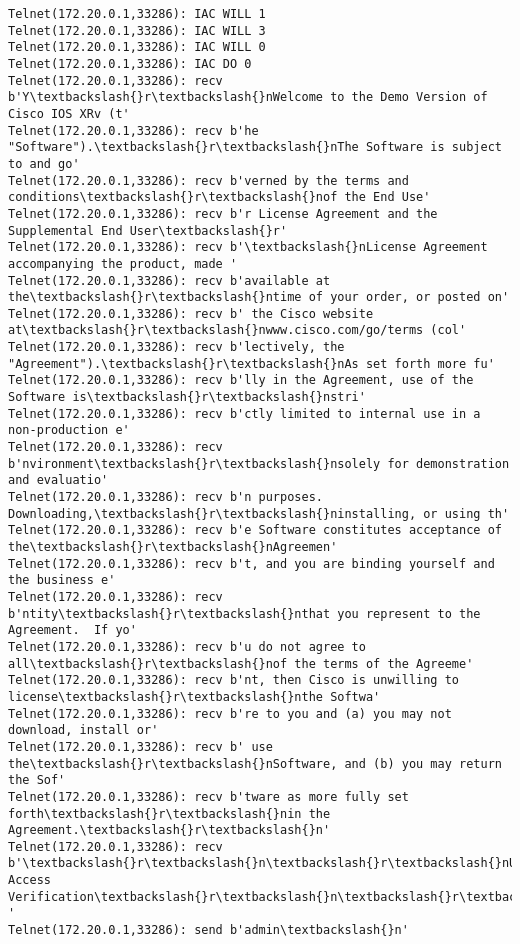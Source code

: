 \documentclass[11pt]{article}
\begin{document}
\begin{Verbatim}[commandchars=\\\{\}]
Telnet(172.20.0.1,33286): IAC WILL 1
Telnet(172.20.0.1,33286): IAC WILL 3
Telnet(172.20.0.1,33286): IAC WILL 0
Telnet(172.20.0.1,33286): IAC DO 0
Telnet(172.20.0.1,33286): recv b'Y\textbackslash{}r\textbackslash{}nWelcome to the Demo Version of Cisco IOS XRv (t'
Telnet(172.20.0.1,33286): recv b'he "Software").\textbackslash{}r\textbackslash{}nThe Software is subject to and go'
Telnet(172.20.0.1,33286): recv b'verned by the terms and conditions\textbackslash{}r\textbackslash{}nof the End Use'
Telnet(172.20.0.1,33286): recv b'r License Agreement and the Supplemental End User\textbackslash{}r'
Telnet(172.20.0.1,33286): recv b'\textbackslash{}nLicense Agreement accompanying the product, made '
Telnet(172.20.0.1,33286): recv b'available at the\textbackslash{}r\textbackslash{}ntime of your order, or posted on'
Telnet(172.20.0.1,33286): recv b' the Cisco website at\textbackslash{}r\textbackslash{}nwww.cisco.com/go/terms (col'
Telnet(172.20.0.1,33286): recv b'lectively, the "Agreement").\textbackslash{}r\textbackslash{}nAs set forth more fu'
Telnet(172.20.0.1,33286): recv b'lly in the Agreement, use of the Software is\textbackslash{}r\textbackslash{}nstri'
Telnet(172.20.0.1,33286): recv b'ctly limited to internal use in a non-production e'
Telnet(172.20.0.1,33286): recv b'nvironment\textbackslash{}r\textbackslash{}nsolely for demonstration and evaluatio'
Telnet(172.20.0.1,33286): recv b'n purposes.  Downloading,\textbackslash{}r\textbackslash{}ninstalling, or using th'
Telnet(172.20.0.1,33286): recv b'e Software constitutes acceptance of the\textbackslash{}r\textbackslash{}nAgreemen'
Telnet(172.20.0.1,33286): recv b't, and you are binding yourself and the business e'
Telnet(172.20.0.1,33286): recv b'ntity\textbackslash{}r\textbackslash{}nthat you represent to the Agreement.  If yo'
Telnet(172.20.0.1,33286): recv b'u do not agree to all\textbackslash{}r\textbackslash{}nof the terms of the Agreeme'
Telnet(172.20.0.1,33286): recv b'nt, then Cisco is unwilling to license\textbackslash{}r\textbackslash{}nthe Softwa'
Telnet(172.20.0.1,33286): recv b're to you and (a) you may not download, install or'
Telnet(172.20.0.1,33286): recv b' use the\textbackslash{}r\textbackslash{}nSoftware, and (b) you may return the Sof'
Telnet(172.20.0.1,33286): recv b'tware as more fully set forth\textbackslash{}r\textbackslash{}nin the Agreement.\textbackslash{}r\textbackslash{}n'
Telnet(172.20.0.1,33286): recv b'\textbackslash{}r\textbackslash{}n\textbackslash{}r\textbackslash{}nUser Access Verification\textbackslash{}r\textbackslash{}n\textbackslash{}r\textbackslash{}nUsername: '
Telnet(172.20.0.1,33286): send b'admin\textbackslash{}n'

\end{Verbatim}
\end{document}
